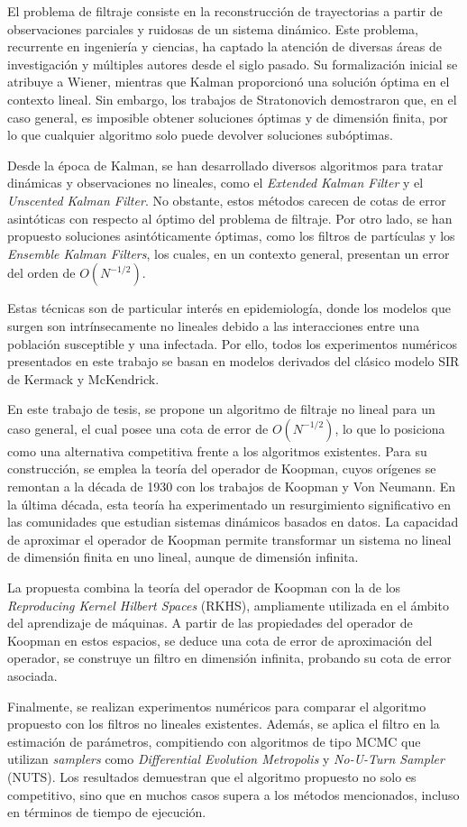 El problema de filtraje consiste en la reconstrucción de trayectorias a partir de observaciones parciales y ruidosas de un sistema dinámico. Este problema, recurrente en ingeniería y ciencias, ha captado la atención de diversas áreas de investigación y múltiples autores desde el siglo pasado. Su formalización inicial se atribuye a Wiener, mientras que Kalman proporcionó una solución óptima en el contexto lineal. Sin embargo, los trabajos de Stratonovich demostraron que, en el caso general, es imposible obtener soluciones óptimas y de dimensión finita, por lo que cualquier algoritmo solo puede devolver soluciones subóptimas.

Desde la época de Kalman, se han desarrollado diversos algoritmos para tratar dinámicas y observaciones no lineales, como el \textit{Extended Kalman Filter} y el \textit{Unscented Kalman Filter}. No obstante, estos métodos carecen de cotas de error asintóticas con respecto al óptimo del problema de filtraje. Por otro lado, se han propuesto soluciones asintóticamente óptimas, como los filtros de partículas y los \textit{Ensemble Kalman Filters}, los cuales, en un contexto general, presentan un error del orden de \( O(N^{-1/2}) \).

Estas técnicas son de particular interés en epidemiología, donde los modelos que surgen son intrínsecamente no lineales debido a las interacciones entre una población susceptible y una infectada. Por ello, todos los experimentos numéricos presentados en este trabajo se basan en modelos derivados del clásico modelo SIR de Kermack y McKendrick.

En este trabajo de tesis, se propone un algoritmo de filtraje no lineal para un caso general, el cual posee una cota de error de \( O(N^{-1/2}) \), lo que lo posiciona como una alternativa competitiva frente a los algoritmos existentes. Para su construcción, se emplea la teoría del operador de Koopman, cuyos orígenes se remontan a la década de 1930 con los trabajos de Koopman y Von Neumann. En la última década, esta teoría ha experimentado un resurgimiento significativo en las comunidades que estudian sistemas dinámicos basados en datos. La capacidad de aproximar el operador de Koopman permite transformar un sistema no lineal de dimensión finita en uno lineal, aunque de dimensión infinita.

La propuesta combina la teoría del operador de Koopman con la de los \textit{Reproducing Kernel Hilbert Spaces} (RKHS), ampliamente utilizada en el ámbito del aprendizaje de máquinas. A partir de las propiedades del operador de Koopman en estos espacios, se deduce una cota de error de aproximación del operador, se construye un filtro en dimensión infinita, probando su cota de error asociada.

Finalmente, se realizan experimentos numéricos para comparar el algoritmo propuesto con los filtros no lineales existentes. Además, se aplica el filtro en la estimación de parámetros, compitiendo con algoritmos de tipo MCMC que utilizan \textit{samplers} como \textit{Differential Evolution Metropolis} y \textit{No-U-Turn Sampler} (NUTS). Los resultados demuestran que el algoritmo propuesto no solo es competitivo, sino que en muchos casos supera a los métodos mencionados, incluso en términos de tiempo de ejecución.